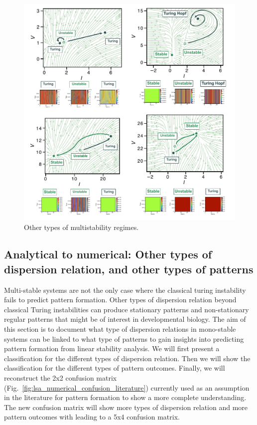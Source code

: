 \begin{figure}[H] %
    \centering
    \begin{adjustbox}{center}
    \includegraphics[width=1.4\textwidth]{chapters/Chapter 1/multistability_leftover} %
    \end{adjustbox}
    \caption{Other types of multistability regimes.}
    \label{fig:multistability_leftover} %
\end{figure}


\subsection{Analytical to numerical: Other types of dispersion relation, and other types of patterns}
Multi-stable systems are not the only case where the classical turing instability fails to predict pattern formation.
Other types of dispersion relation beyond classical Turing instabilities can produce stationary patterns and non-stationary regular patterns that might be of interest in developmental biology.
The aim of this section is to document what type of dispersion relations in mono-stable systems can be linked to what type of patterns to gain insights into predicting pattern formation from linear stability analysis.
We will first present a classification for the different types of dispersion relation.
Then we will show the classification for the different types of pattern outcomes.
Finally, we will reconstruct the 2x2 confusion matrix (Fig.~\ref{fig:lsa_numerical_confusion_literature}) currently used as an assumption in the literature for pattern formation to show a more complete understanding. The new confusion matrix will show more types of dispersion relation and more pattern outcomes with leading to a 5x4 confusion matrix.

